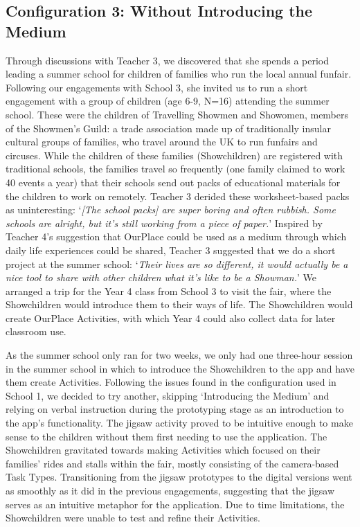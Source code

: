 \documentclass[,hyphens]{sigchi}
\begin{document}
\subsection{Configuration 3: Without Introducing the Medium}
Through discussions with Teacher 3, we discovered that she spends a period leading a summer school for children of families who run the local annual funfair. Following our engagements with School 3, she invited us to run a short engagement with a group of children (age 6-9, N=16) attending the summer school. These were the children of Travelling Showmen and Showomen, members of the Showmen's Guild: a trade association made up of traditionally insular cultural groups of families, who travel around the UK to run funfairs and circuses. While the children of these families (Showchildren) are registered with traditional schools, the families travel so frequently (one family claimed to work 40 events a year) that their schools send out packs of educational materials for the children to work on remotely. Teacher 3 derided these worksheet-based packs as uninteresting: `\textit{[The school packs] are super boring and often rubbish. Some schools are alright, but it's still working from a piece of paper.}' Inspired by Teacher 4's suggestion that OurPlace could be used as a medium through which daily life experiences could be shared, Teacher 3 suggested that we do a short project at the summer school: `\textit{Their lives are so different, it would actually be a nice tool to share with other children what it's like to be a Showman.}' We arranged a trip for the Year 4 class from School 3 to visit the fair, where the Showchildren would introduce them to their ways of life. The Showchildren would create OurPlace Activities, with which Year 4 could also collect data for later classroom use.

As the summer school only ran for two weeks, we only had one three-hour session in the summer school in which to introduce the Showchildren to the app and have them create Activities. Following the issues found in the configuration used in School 1, we decided to try another, skipping `Introducing the Medium' and relying on verbal instruction during the prototyping stage as an introduction to the app's functionality. The jigsaw activity proved to be intuitive enough to make sense to the children without them first needing to use the application. The Showchildren gravitated towards making Activities which focused on their families' rides and stalls within the fair, mostly consisting of the camera-based Task Types. Transitioning from the jigsaw prototypes to the digital versions went as smoothly as it did in the previous engagements, suggesting that the jigsaw serves as an intuitive metaphor for the application. Due to time limitations, the Showchildren were unable to test and refine their Activities.
\end{document}
